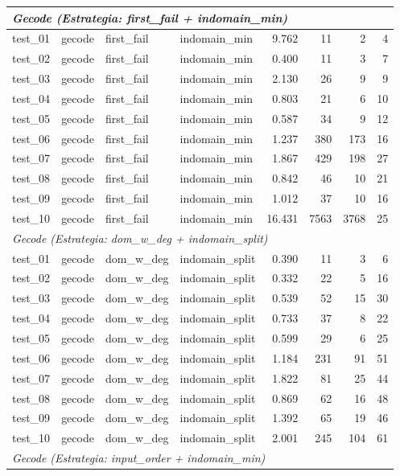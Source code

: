 \begin{longtable}{l l l l r r r r}
\multicolumn{8}{l}{\textit{Gecode (Estrategia: first\_fail + indomain\_min)}} \\
\midrule
test\_01 & gecode & first\_fail & indomain\_min & 9.762 & 11 & 2 & 4 \\
test\_02 & gecode & first\_fail & indomain\_min & 0.400 & 11 & 3 & 7 \\
test\_03 & gecode & first\_fail & indomain\_min & 2.130 & 26 & 9 & 9 \\
test\_04 & gecode & first\_fail & indomain\_min & 0.803 & 21 & 6 & 10 \\
test\_05 & gecode & first\_fail & indomain\_min & 0.587 & 34 & 9 & 12 \\
test\_06 & gecode & first\_fail & indomain\_min & 1.237 & 380 & 173 & 16 \\
test\_07 & gecode & first\_fail & indomain\_min & 1.867 & 429 & 198 & 27 \\
test\_08 & gecode & first\_fail & indomain\_min & 0.842 & 46 & 10 & 21 \\
test\_09 & gecode & first\_fail & indomain\_min & 1.012 & 37 & 10 & 16 \\
test\_10 & gecode & first\_fail & indomain\_min & 16.431 & 7563 & 3768 & 25 \\
\midrule
\multicolumn{8}{l}{\textit{Gecode (Estrategia: dom\_w\_deg + indomain\_split)}} \\
\midrule
test\_01 & gecode & dom\_w\_deg & indomain\_split & 0.390 & 11 & 3 & 6 \\
test\_02 & gecode & dom\_w\_deg & indomain\_split & 0.332 & 22 & 5 & 16 \\
test\_03 & gecode & dom\_w\_deg & indomain\_split & 0.539 & 52 & 15 & 30 \\
test\_04 & gecode & dom\_w\_deg & indomain\_split & 0.733 & 37 & 8 & 22 \\
test\_05 & gecode & dom\_w\_deg & indomain\_split & 0.599 & 29 & 6 & 25 \\
test\_06 & gecode & dom\_w\_deg & indomain\_split & 1.184 & 231 & 91 & 51 \\
test\_07 & gecode & dom\_w\_deg & indomain\_split & 1.822 & 81 & 25 & 44 \\
test\_08 & gecode & dom\_w\_deg & indomain\_split & 0.869 & 62 & 16 & 48 \\
test\_09 & gecode & dom\_w\_deg & indomain\_split & 1.392 & 65 & 19 & 46 \\
test\_10 & gecode & dom\_w\_deg & indomain\_split & 2.001 & 245 & 104 & 61 \\
\midrule
\multicolumn{8}{l}{\textit{Gecode (Estrategia: input\_order + indomain\_min)}} \\

\end{longtable}
